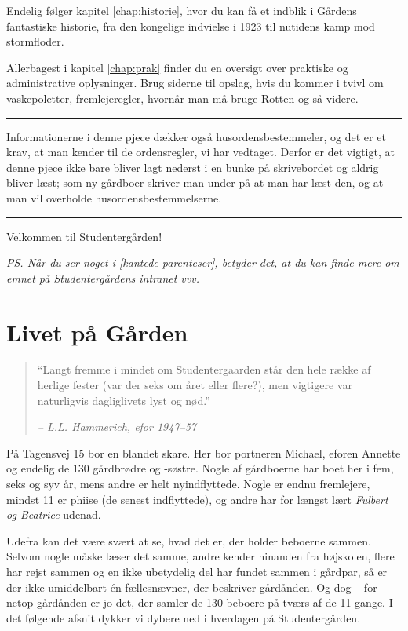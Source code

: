 \documentclass[11pt,article,twoside,openany,danish,extrafontsizes]{memoir} %
\begin{document}
Endelig følger kapitel \vref{chap:historie}, hvor du kan få et indblik i Gårdens fantastiske historie, fra den kongelige indvielse i 1923 til nutidens kamp mod stormfloder.

Allerbagest i kapitel \vref{chap:prak} finder du en oversigt over praktiske og administrative oplysninger. Brug siderne til opslag, hvis du kommer i tvivl om vaskepoletter, fremlejeregler, hvornår man må bruge Rotten og så videre.

\plainbreak{1}

Informationerne i denne pjece dækker også husordensbestemmeler, og det er et krav, at man kender til de ordensregler, vi har vedtaget. Derfor er det vigtigt, at denne pjece ikke bare bliver lagt nederst i en bunke på skrivebordet og aldrig bliver læst; som ny gårdboer skriver man under på at man har læst den, og at man vil overholde husordensbestemmelserne.

\plainbreak{1}

Velkommen til Studentergården!

\vfill

\noindent
\textit{PS. Når du ser noget i [kantede parenteser], betyder det, at du kan finde mere om emnet på Studentergårdens intranet vvv.}


\clearpage
\tableofcontents*
\clearpage

\chapter{Livet på Gården}
\label{chap:liv}

\begin{quote} \small
\enquote{Langt fremme i mindet om Studentergaarden står den hele række af herlige fester (var der seks om året eller flere?), men vigtigere var naturligvis dagliglivets lyst og nød.}

\emph{-- L.L. Hammerich, efor 1947--57}
\end{quote}

\noindent
På Tagensvej 15 bor en blandet skare. Her bor portneren Michael, eforen Annette og endelig de 130 gårdbrødre og -søstre. Nogle af gårdboerne har boet her i fem, seks og syv år, mens andre er helt nyindflyttede. Nogle er endnu fremlejere, mindst 11 er phiise (de senest indflyttede), og andre har for længst lært \emph{Fulbert og Beatrice} udenad.

Udefra kan det være svært at se, hvad det er, der holder beboerne sammen. Selvom nogle måske læser det samme, andre kender hinanden fra højskolen, flere har rejst sammen og en ikke ubetydelig del har fundet sammen i gårdpar, så er der ikke umiddelbart én fællesnævner, der beskriver gårdånden. Og dog -- for netop gårdånden er jo det, der samler de 130 beboere på tværs af de 11 gange. I det følgende afsnit dykker vi dybere ned i hverdagen på Studentergården.
\end{document}
